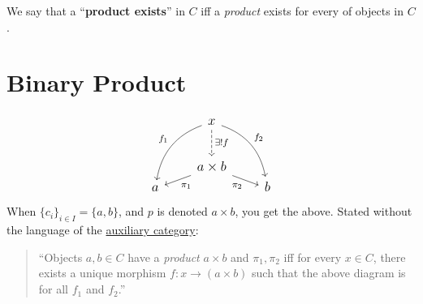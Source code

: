 \documentclass{atomic}
\begin{document}
    \begin{definition}
        We say that a ``\textbf{product exists}'' in $C$ iff a \textit{product} exists for every  of objects in $C$.
    \end{definition}

    \section{Binary Product} \label{binary-product}
    $$\large\begin{tikzcd}[column sep={2em}, row sep={2em}]
        & x \arrow[d, dashed, "\exists!f"] \\
        & \arrow[dl, "\pi_1"] a \times b \arrow[dr, swap, "\pi_2"] \\[-2em]
        a && b
        \arrow[from=1-2, to=3-1, bend right, "f_1"']
        \arrow[from=1-2, to=3-3, bend left, "f_2"]
    \end{tikzcd}$$
    When $\{ c_i \}_{i \in I} = \{ a,b \}$, and $p$ is denoted $a \times b$, you get the above. Stated without the language of the \hyperref[auxiliary-category]{auxiliary category}:

    \begin{quote}
        ``Objects $a,b \in C$ have a \textit{product} $a \times b$ and $\pi_1,\pi_2$ iff for every $x \in C$, there exists a unique morphism $f : x \to (a \times b)$ such that the above diagram is  for all $f_1$ and $f_2$.''
    \end{quote}
\end{document}
